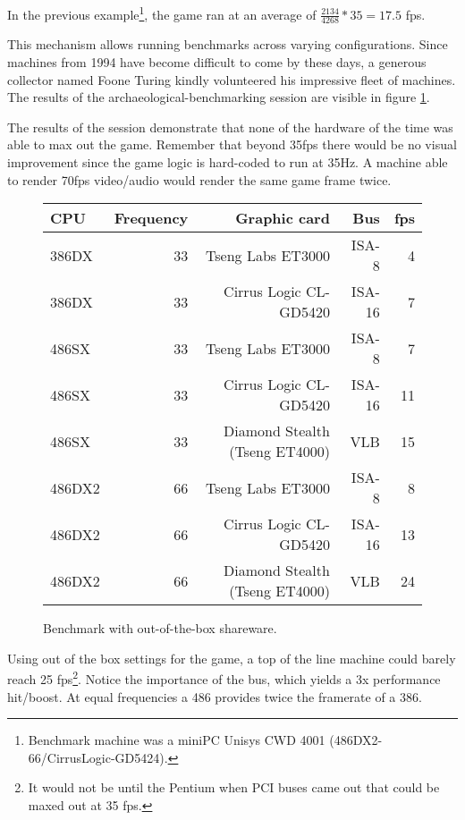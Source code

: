  
In the previous example\footnote{Benchmark machine was a miniPC Unisys CWD 4001 (486DX2-66/CirrusLogic-GD5424).}, the game ran at an average of $\frac{2134}{4268}*35 = 17.5$ fps. \\
\par
This mechanism allows running benchmarks across varying configurations. Since machines from 1994 have become difficult to come by these days, a generous collector named Foone Turing kindly volunteered his impressive fleet of machines. The results of the archaeological-benchmarking session are visible in figure \ref{bnechmarsks}.\\
\par
 The results of the session demonstrate that none of the hardware of the time was able to max out the game. Remember that beyond 35fps there would be no visual improvement since the game logic is hard-coded to run at 35Hz. A machine able to render 70fps video/audio would render the same game frame twice.\\
\par
\begin{figure}[H]
\centering  
\begin{tabularx}{\textwidth}{ L{1}  R{0.3} R{2.4} R{1} R{0.3} }
  \toprule
   \textbf{CPU} & \textbf{Frequency} & \textbf{Graphic card} & \textbf{Bus} & \textbf{fps}\\
  \toprule 
  386DX & 33 & Tseng Labs ET3000    & ISA-8  &  4\\
  386DX\protect\footnotemark & 33 & Cirrus Logic CL-GD5420 & ISA-16 &  7\\
  \toprule 
  486SX & 33 & Tseng Labs ET3000                & ISA-8  &  7\\
  486SX & 33 & Cirrus Logic CL-GD5420           & ISA-16 & 11\\ 
  486SX & 33 & Diamond Stealth (Tseng ET4000)   & VLB    & 15\\
  \toprule 
  486DX2 & 66 & Tseng Labs ET3000               & ISA-8  &  8\\
  486DX2 & 66 & Cirrus Logic CL-GD5420          & ISA-16 & 13\\
  486DX2 & 66 & Diamond Stealth (Tseng ET4000)  & VLB    & 24\\
   \toprule
 \end{tabularx}
\caption{Benchmark with out-of-the-box \doom{} shareware.}
\label{bnechmarsks}
\end{figure}
\par
Using out of the box settings for the game, a top of the line machine could barely reach 25 fps\footnote{It would not be until the Pentium when PCI buses came out that \doom{} could be maxed out at 35 fps.}. Notice the importance of the bus, which yields a 3x performance hit/boost. At equal frequencies a 486 provides twice the framerate of a 386.\\
\par






